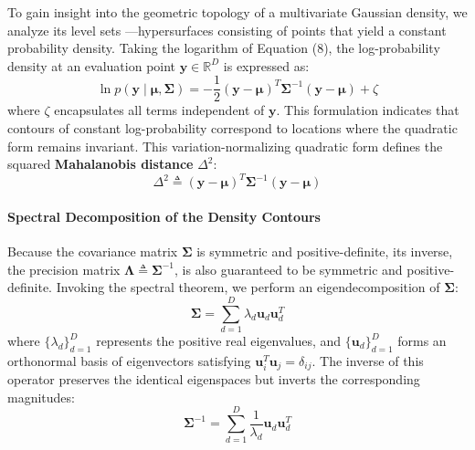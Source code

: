 \documentclass{article}
\begin{document}
To gain insight into the geometric topology of a multivariate Gaussian density, we analyze its level sets —hypersurfaces consisting of points that yield a constant probability density. Taking the logarithm of Equation (8), the log-probability density at an evaluation point $\mathbf{y} \in \mathbb{R}^D$ is expressed as:
\begin{equation}
\ln p(\mathbf{y} \mid \boldsymbol{\mu}, \boldsymbol{\Sigma}) = -\frac{1}{2}(\mathbf{y} - \boldsymbol{\mu})^T \boldsymbol{\Sigma}^{-1}(\mathbf{y} - \boldsymbol{\mu}) + \zeta \tag{11}
\end{equation}
where $\zeta$ encapsulates all terms independent of $\mathbf{y}$. This formulation indicates that contours of constant log-probability correspond to locations where the quadratic form remains invariant. This variation-normalizing quadratic form defines the squared \textbf{Mahalanobis distance} $\Delta^2$:
\begin{equation}
\Delta^2 \triangleq (\mathbf{y} - \boldsymbol{\mu})^T \boldsymbol{\Sigma}^{-1}(\mathbf{y} - \boldsymbol{\mu}) \tag{12}
\end{equation}

\paragraph{Spectral Decomposition of the Density Contours}
Because the covariance matrix $\boldsymbol{\Sigma}$ is symmetric and positive-definite, its inverse, the precision matrix $\boldsymbol{\Lambda} \triangleq \boldsymbol{\Sigma}^{-1}$, is also guaranteed to be symmetric and positive-definite. Invoking the spectral theorem, we perform an eigendecomposition of $\boldsymbol{\Sigma}$:
\begin{equation}
\boldsymbol{\Sigma} = \sum_{d=1}^D \lambda_d \mathbf{u}_d \mathbf{u}_d^T \tag{13}
\end{equation}
where $\{\lambda_d\}_{d=1}^D$ represents the positive real eigenvalues, and $\{\mathbf{u}_d\}_{d=1}^D$ forms an orthonormal basis of eigenvectors satisfying $\mathbf{u}_i^T \mathbf{u}_j = \delta_{ij}$. The inverse of this operator preserves the identical eigenspaces but inverts the corresponding magnitudes:
\begin{equation}
\boldsymbol{\Sigma}^{-1} = \sum_{d=1}^D \frac{1}{\lambda_d} \mathbf{u}_d \mathbf{u}_d^T \tag{14}
\end{equation}
\end{document}
